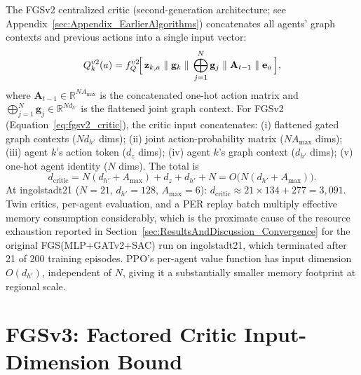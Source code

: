 The FGSv2 centralized critic (second-generation architecture; see Appendix~\ref{sec:Appendix_EarlierAlgorithms}) concatenates all agents' graph contexts and previous actions into a single input vector:
\begin{equation}
  Q_k^{v2}(a) = f_Q^{v2}\!\Bigl[\,
    \mathbf{z}_{k,a}\;\Vert\;
    \mathbf{g}_k\;\Vert\;
    \bigoplus_{j=1}^{N}\mathbf{g}_j\;\Vert\;
    \mathbf{A}_{t-1}\;\Vert\;
    \mathbf{e}_a
  \,\Bigr],
  \label{eq:fgsv2_critic}
\end{equation}
where $\mathbf{A}_{t-1} \in \mathbb{R}^{NA_{\max}}$ is the concatenated one-hot action matrix and $\bigoplus_{j=1}^N\mathbf{g}_j \in \mathbb{R}^{Nd_{h'}}$ is the flattened joint graph context. For FGSv2 (Equation~\ref{eq:fgsv2_critic}), the critic input concatenates: (i) flattened gated graph contexts ($Nd_{h'}$ dims); (ii) joint action-probability matrix ($NA_{\max}$ dims); (iii) agent $k$'s action token ($d_z$ dims); (iv) agent $k$'s graph context ($d_{h'}$ dims); (v) one-hot agent identity ($N$ dims). The total is
\begin{equation}
  d_{\mathrm{critic}} = N(d_{h'} + A_{\max}) + d_z + d_{h'} + N
                       = O\!\bigl(N(d_{h'} + A_{\max})\bigr).
  \label{eq:critic_dim}
\end{equation}
At ingolstadt21 ($N=21$, $d_{h'}=128$, $A_{\max}=6$): $d_{\mathrm{critic}} \approx 21\times 134 + 277 = 3{,}091$. Twin critics, per-agent evaluation, and a PER replay batch multiply effective memory consumption considerably, which is the proximate cause of the resource exhaustion reported in Section~\ref{sec:ResultsAndDiscussion_Convergence} for the original FGS(MLP+GATv2+SAC) run on ingolstadt21, which terminated after 21 of 200 training episodes. PPO's per-agent value function has input dimension $O(d_{h'})$, independent of $N$, giving it a substantially smaller memory footprint at regional scale.

\section{FGSv3: Factored Critic Input-Dimension Bound}
\label{sec:Appendix_fgsv3_critic_complexity}

